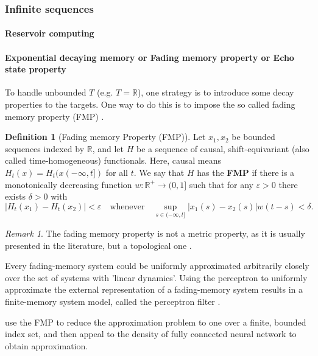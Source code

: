\documentclass{article}
\theoremstyle{definition}
\newtheorem{definition}{Definition}
\theoremstyle{remark}
\newtheorem{remark}{Remark}
\begin{document}
\subsubsection{Infinite sequences}
\paragraph{Reservoir computing}
\citep{li2024simple}
\citep{grigoryeva2024forecasting}


\paragraph{Exponential decaying memory or Fading memory property or Echo state property}

To handle unbounded $T$ (e.g. $T = \mathbb{R}$), one strategy is to introduce some decay properties to the targets.
One way to do this is to impose the so called  fading memory property (FMP) \citep{boyd1985fading}.

\begin{definition}[Fading memory Property (FMP)]
Let $x_1, x_2$ be bounded sequences indexed by $\mathbb{R}$, and let $H$ be a sequence of causal, shift-equivariant (also called time-homogeneous) functionals.
Here, causal means $H_t(x) = H_t(x(-\infty,t])$ for all $t$.
We say that $H$ has the \textbf{FMP} if there is a monotonically decreasing function $w : \mathbb{R}^+ \to (0, 1]$ such that for any $\varepsilon > 0$ there exists $\delta > 0$ with 
\[
|H_t(x_1) - H_t(x_2)| < \varepsilon \quad \text{whenever} \quad \sup_{s \in (-\infty, t]} |x_1(s) - x_2(s)| w(t - s) < \delta.
\]
\end{definition}

\begin{remark}
The fading memory property is not a metric property, as it is usually presented in the literature, but a topological one \citep{grigoryeva2018universal}. 
\end{remark}


Every fading-memory system could be uniformly approximated arbitrarily closely over the set of systems with 'linear dynamics'\citep{matthews1993approximating}. %
Using the perceptron to uniformly approximate the external representation of a fading-memory system results in a finite-memory system model, called the perceptron filter \citep{matthews1993approximating}.


\citet{gonon2021fading} use the FMP to reduce the approximation problem to one over a finite, bounded index set, and then appeal to the density of fully connected neural network to obtain approximation.
\end{document}
